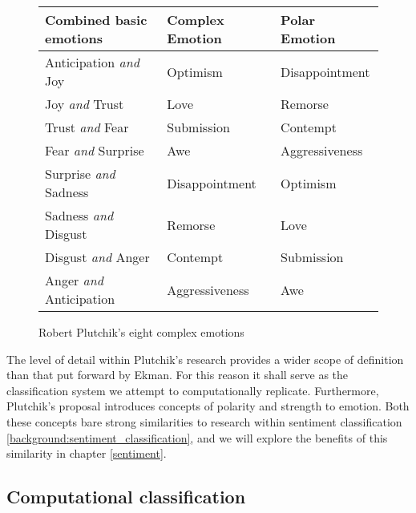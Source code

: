 \begin{figure}[h]
	\caption{Robert Plutchik's eight complex emotions}
	\centering
	\begin{tabular}{ | l | l | l | }
		\hline
		Combined basic emotions & Complex Emotion & Polar Emotion \\
		\hline 
		Anticipation \emph{and} Joy & Optimism & Disappointment \\
		Joy \emph{and} Trust & Love & Remorse \\
		Trust \emph{and} Fear & Submission & Contempt \\
		Fear \emph{and} Surprise & Awe & Aggressiveness \\
		Surprise \emph{and} Sadness & Disappointment & Optimism \\
		Sadness \emph{and} Disgust & Remorse & Love \\
		Disgust \emph{and} Anger & Contempt & Submission \\
		Anger \emph{and} Anticipation & Aggressiveness & Awe \\
		\hline
	\end{tabular}
\end{figure}

The level of detail within Plutchik's research provides a wider scope of definition than that put forward by Ekman. For this reason it shall serve as the classification system we attempt to computationally replicate. Furthermore, Plutchik's proposal introduces concepts of polarity and strength to emotion. Both these concepts bare strong similarities to research within sentiment classification \ref{background:sentiment_classification}, and we will explore the benefits of this similarity in chapter \ref{sentiment}.

\subsection{Computational classification}










\begin{comment}

As discussed in section \ref{background:sentiment_analysis}, research into sentiment analysis has largely focussed on the polarity of sentiment i.e. is it negative or positive. 

Emotions from text \cite{Alm:2005vc}
	- application for reading with emotion

Real world knowledge for affect sensing \cite{Liu:2003ts}

Twitter and emotion \cite{Bollen:2009wva}

\end{comment}



